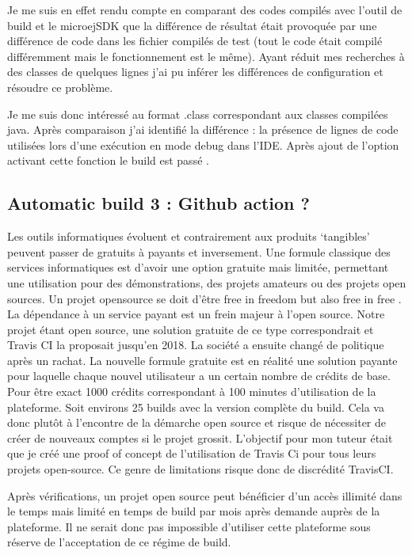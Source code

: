 \documentclass[french,a4paper,12pt]{report}
\begin{document}
Je me suis en effet rendu compte en comparant des codes compilés avec l’outil de build et le microejSDK que la différence de résultat était provoquée par une différence de code dans les fichier compilés de test (tout le code était compilé différemment mais le fonctionnement est le même). Ayant réduit mes recherches à des classes de quelques lignes j’ai pu inférer les différences de configuration et résoudre ce problème.

Je me suis donc intéressé au format .class correspondant aux classes compilées java. 
Après comparaison j’ai identifié la différence : la présence de lignes de code utilisées lors d'une exécution en mode debug dans l’IDE. Après ajout de l’option activant cette fonction le build est passé .

\subsection{Automatic build 3 : Github action ?}

Les outils informatiques évoluent et contrairement aux produits ‘tangibles’ peuvent passer de gratuits à payants et inversement. Une formule classique des services informatiques est d’avoir une option gratuite mais limitée, permettant une utilisation pour des démonstrations, des projets amateurs ou des projets open sources. Un projet opensource se doit d’être free in freedom but also free in free . La dépendance à un service payant est un frein majeur à l’open source. Notre projet étant open source, une solution gratuite de ce type correspondrait et Travis CI la proposait jusqu’en 2018. La société a ensuite changé de politique après un rachat. La nouvelle formule gratuite est en réalité une solution payante pour laquelle chaque nouvel utilisateur a un certain nombre de crédits de base. Pour être exact 1000 crédits correspondant à 100 minutes d’utilisation de la plateforme. Soit environs 25 builds avec la version complète du build. Cela va donc plutôt à l’encontre de la démarche open source et risque de nécessiter de créer de nouveaux comptes si le projet grossit. L’objectif pour mon tuteur était que je créé une proof of concept de l’utilisation de Travis Ci pour tous leurs projets open-source. Ce genre de limitations risque donc de discrédité TravisCI.

Après vérifications, un projet open source peut bénéficier d’un accès illimité dans le temps mais limité en temps de build par mois après demande auprès de la plateforme. Il ne serait donc pas impossible d’utiliser cette plateforme sous réserve de l’acceptation de ce régime de build.
\end{document}
